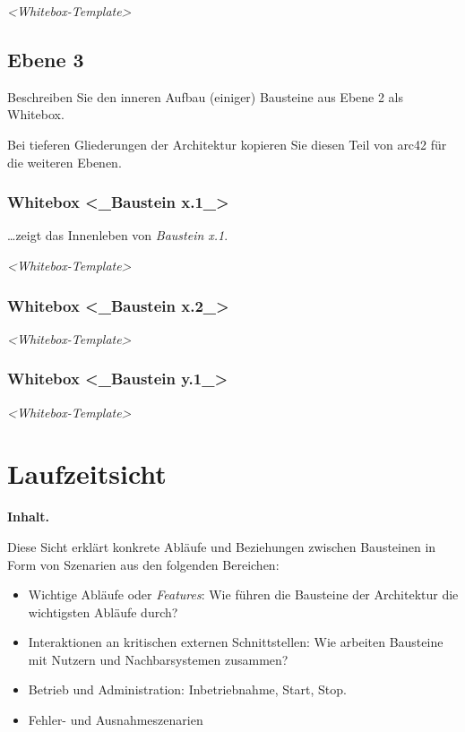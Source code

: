 \documentclass[]{article}
\begin{document}
\emph{\textless{}Whitebox-Template\textgreater{}}

\hypertarget{_ebene_3}{%
\subsection{Ebene 3}\label{_ebene_3}}

Beschreiben Sie den inneren Aufbau (einiger) Bausteine aus Ebene 2 als
Whitebox.

Bei tieferen Gliederungen der Architektur kopieren Sie diesen Teil von
arc42 für die weiteren Ebenen.

\hypertarget{_whitebox_baustein_x_1}{%
\subsubsection{Whitebox \textless{}\_Baustein
x.1\_\textgreater{}}\label{_whitebox_baustein_x_1}}

\ldots{}zeigt das Innenleben von \emph{Baustein x.1}.

\emph{\textless{}Whitebox-Template\textgreater{}}

\hypertarget{_whitebox_baustein_x_2}{%
\subsubsection{Whitebox \textless{}\_Baustein
x.2\_\textgreater{}}\label{_whitebox_baustein_x_2}}

\emph{\textless{}Whitebox-Template\textgreater{}}

\hypertarget{_whitebox_baustein_y_1}{%
\subsubsection{Whitebox \textless{}\_Baustein
y.1\_\textgreater{}}\label{_whitebox_baustein_y_1}}

\emph{\textless{}Whitebox-Template\textgreater{}}

\hypertarget{section-runtime-view}{%
\section{Laufzeitsicht}\label{section-runtime-view}}

\textbf{Inhalt.}

Diese Sicht erklärt konkrete Abläufe und Beziehungen zwischen Bausteinen
in Form von Szenarien aus den folgenden Bereichen:

\begin{itemize}
\item
  Wichtige Abläufe oder \emph{Features}: Wie führen die Bausteine der
  Architektur die wichtigsten Abläufe durch?
\item
  Interaktionen an kritischen externen Schnittstellen: Wie arbeiten
  Bausteine mit Nutzern und Nachbarsystemen zusammen?
\item
  Betrieb und Administration: Inbetriebnahme, Start, Stop.
\item
  Fehler- und Ausnahmeszenarien
\end{itemize}
\end{document}
